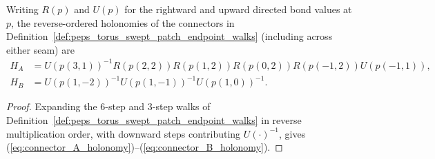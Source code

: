 \begin{lemma}
    \label{thm:peps_torus_swept_patch_connector_transport}
    \leanok
    Writing $R(p)$ and $U(p)$ for the rightward and upward directed bond values at $p$, the reverse-ordered holonomies of the connectors in Definition~\ref{def:peps_torus_swept_patch_endpoint_walks} (including across either seam) are
    \begin{align}
        H_A & = U(p(3,1))^{-1}R(p(2,2))R(p(1,2))R(p(0,2))R(p(-1,2))U(p(-1,1)), \label{eq:connector_A_holonomy} \\
        H_B & = U(p(1,-2))^{-1}U(p(1,-1))^{-1}U(p(1,0))^{-1}. \label{eq:connector_B_holonomy}
    \end{align}
\end{lemma}
\begin{proof}\leanok
    Expanding the $6$-step and $3$-step walks of Definition~\ref{def:peps_torus_swept_patch_endpoint_walks} in reverse multiplication order, with downward steps contributing $U(\cdot)^{-1}$, gives (\ref{eq:connector_A_holonomy})--(\ref{eq:connector_B_holonomy}).
\end{proof}
